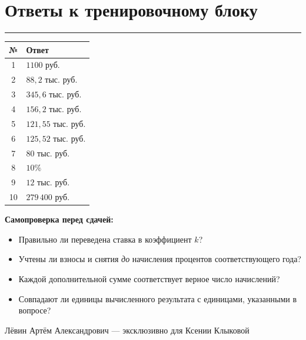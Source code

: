 \documentclass[a4paper,12pt]{article}
\newcommand{\lessonsection}[1]{\section{#1}\vspace{-0.2em}\noindent\textcolor{accent}{\rule{\linewidth}{0.55pt}}\vspace{0.2em}}
\begin{document}
\endgroup
\clearpage
\lessonsection{Ответы к тренировочному блоку}
\renewcommand{\arraystretch}{1.45}
\begin{center}
\begin{tabularx}{0.78\linewidth}{@{}c X@{}}
\toprule
№ & Ответ\\
\midrule
1 & $1100$ руб.\\
2 & $88{,}2$ тыс. руб.\\
3 & $345{,}6$ тыс. руб.\\
4 & $156{,}2$ тыс. руб.\\
5 & $121{,}55$ тыс. руб.\\
6 & $125{,}52$ тыс. руб.\\
7 & $80$ тыс. руб.\\
8 & $10\%$\\
9 & $12$ тыс. руб.\\
10 & $279\,400$ руб.\\
\bottomrule
\end{tabularx}
\end{center}
\vspace{9mm}
\noindent\textcolor{darkaccent}{\textbf{Самопроверка перед сдачей:}}
\begin{itemize}
\item Правильно ли переведена ставка в коэффициент $k$?
\item Учтены ли взносы и снятия \emph{до} начисления процентов соответствующего года?
\item Каждой дополнительной сумме соответствует верное число начислений?
\item Совпадают ли единицы вычисленного результата с единицами, указанными в вопросе?
\end{itemize}
\vfill
\begin{center}
\small\textcolor{darkaccent}{Лёвин Артём Александрович --- эксклюзивно для Ксении Клыковой}
\end{center}
\end{document}
